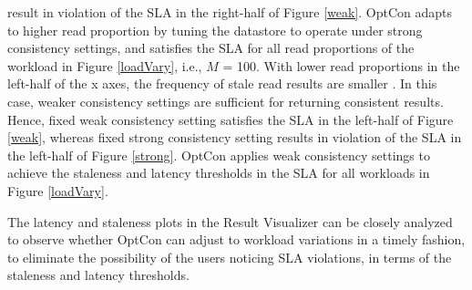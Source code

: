 \documentclass{vldb}
\begin{document}
   result in violation of the SLA in the right-half of Figure \ref{weak}. 
  OptCon adapts to higher read proportion by tuning the datastore to operate under strong consistency settings, and satisfies the SLA for all read proportions of the workload in Figure \ref{loadVary}, i.e., $M$ = 100.  %
 With lower read proportions in the left-half of the x axes, the frequency of stale read results are smaller \cite{DBLP:conf/cloud/GolabRAKWG13}. In this case,
weaker consistency settings are sufficient for returning
consistent results. Hence, fixed weak consistency setting
   satisfies the SLA in the left-half of Figure \ref{weak}, whereas fixed strong consistency setting
   results in violation of the SLA in the left-half of Figure \ref{strong}. OptCon applies weak consistency settings to achieve the staleness and latency thresholds in the SLA for all workloads in Figure \ref{loadVary}.
  \par The latency and staleness plots in the Result Visualizer can be closely analyzed to observe whether OptCon can adjust to workload variations in a timely fashion, to eliminate the possibility of the users noticing SLA violations, in terms of the staleness and latency thresholds.
\end{document}
